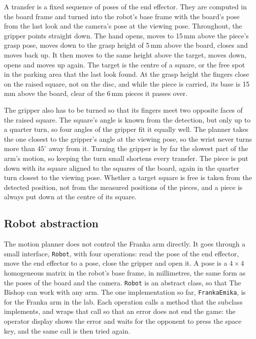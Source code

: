 A transfer is a fixed sequence of poses of the end effector.
They are computed in the board frame and turned into the robot's base frame with the board's pose from the last look and the camera's pose at the viewing pose.
Throughout, the gripper points straight down.
The hand opens, moves to 15\,mm above the piece's grasp pose, moves down to the grasp height of 5\,mm above the board, closes and moves back up.
It then moves to the same height above the target, moves down, opens and moves up again.
The target is the centre of a square, or the free spot in the parking area that the last look found.
At the grasp height the fingers close on the raised square, not on the disc, and while the piece is carried, its base is 15\,mm above the board, clear of the 6\,mm pieces it passes over.

The gripper also has to be turned so that its fingers meet two opposite faces of the raised square.
The square's angle is known from the detection, but only up to a quarter turn, so four angles of the gripper fit it equally well.
The planner takes the one closest to the gripper's angle at the viewing pose, so the wrist never turns more than $45^\circ$ away from it.
Turning the gripper is by far the slowest part of the arm's motion, so keeping the turn small shortens every transfer.
The piece is put down with its square aligned to the squares of the board, again in the quarter turn closest to the viewing pose.
Whether a target square is free is taken from the detected position, not from the measured positions of the pieces, and a piece is always put down at the centre of its square.

\subsection{Robot abstraction}
\label{subsec:robot-abstraction}

The motion planner does not control the Franka arm directly.
It goes through a small interface, \texttt{Robot}, with four operations: read the pose of the end effector, move the end effector to a pose, close the gripper and open it.
A pose is a $4 \times 4$ homogeneous matrix in the robot's base frame, in millimetres, the same form as the poses of the board and the camera.
\texttt{Robot} is an abstract class, so that The Bishop can work with any arm.
The one implementation so far, \texttt{FrankaEmika}, is for the Franka arm in the lab.
Each operation calls a method that the subclass implements, and wraps that call so that an error does not end the game: the operator display shows the error and waits for the opponent to press the space key, and the same call is then tried again.

